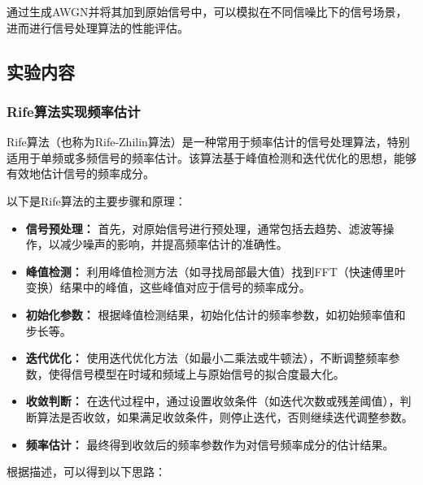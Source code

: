 \documentclass[a4paper,12pt]{article}
\begin{document}
通过生成AWGN并将其加到原始信号中，可以模拟在不同信噪比下的信号场景，进而进行信号处理算法的性能评估。

\subsection{实验内容}
\subsubsection{Rife算法实现频率估计}
Rife算法（也称为Rife-Zhilin算法）是一种常用于频率估计的信号处理算法，特别适用于单频或多频信号的频率估计。该算法基于峰值检测和迭代优化的思想，能够有效地估计信号的频率成分。\cite{rife1989digital}

以下是Rife算法的主要步骤和原理：
\begin{itemize}
    \item \textbf{信号预处理：} 首先，对原始信号进行预处理，通常包括去趋势、滤波等操作，以减少噪声的影响，并提高频率估计的准确性。
    
    \item \textbf{峰值检测：} 利用峰值检测方法（如寻找局部最大值）找到FFT（快速傅里叶变换）结果中的峰值，这些峰值对应于信号的频率成分。
    
    \item \textbf{初始化参数：} 根据峰值检测结果，初始化估计的频率参数，如初始频率值和步长等。
    
    \item \textbf{迭代优化：} 使用迭代优化方法（如最小二乘法或牛顿法），不断调整频率参数，使得信号模型在时域和频域上与原始信号的拟合度最大化。
    
    \item \textbf{收敛判断：} 在迭代过程中，通过设置收敛条件（如迭代次数或残差阈值），判断算法是否收敛，如果满足收敛条件，则停止迭代，否则继续迭代调整参数。
    
    \item \textbf{频率估计：} 最终得到收敛后的频率参数作为对信号频率成分的估计结果。
\end{itemize}

根据描述，可以得到以下思路：
\end{document}
